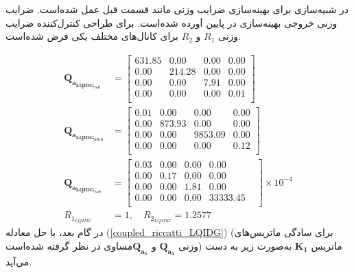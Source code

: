 \documentclass{CCI2020}
\begin{document}
		در شبیه‌سازی برای بهینه‌سازی ضرایب وزنی مانند قسمت قبل عمل شده‌است. ضرایب وزنی خروجی بهینه‌سازی در پایین آورده شده‌است. برای طراحی کنترل‌کننده
		ضرایب وزنی
		$R_1$
		و
		$R_2$
		برای کانال‌های مختلف یکی فرض شده‌است.
		
		\begin{equation}
			\begin{split}
				\boldsymbol{Q_{a_{LQIDG_{roll}}}} &= \begin{bmatrix}
					631.85 & 0.00 & 0.00 & 0.00  \\ 
					0.00 & 214.28 & 0.00 & 0.00  \\ 
					0.00 & 0.00 & 7.91 & 0.00  \\ 
					0.00 & 0.00 & 0.00 & 0.01  \\ 
				\end{bmatrix} \\
				\boldsymbol{Q_{a_{LQIDG_{pitch}}}} &= \begin{bmatrix}
					0.01 & 0.00 & 0.00 & 0.00  \\
					0.00 & 873.93 & 0.00 & 0.00  \\ 
					0.00 & 0.00 & 9853.09 & 0.00 \\ 
					0.00 & 0.00 & 0.00 & 0.12  \\ 
				\end{bmatrix}\\
				\boldsymbol{Q_{a_{LQIDG_{yaw}}}}  &= \begin{bmatrix}
					0.03 & 0.00 & 0.00 & 0.00 & \\ 
					0.00 & 0.17 & 0.00 & 0.00 & \\ 
					0.00 & 0.00 & 1.81 & 0.00 & \\ 
					0.00 & 0.00 & 0.00 & 33333.45 & \\
				\end{bmatrix}\times 10^{-4}\\  R_{1_{LQIDG}} &= 1, \quad  R_{2_{LQIDG}} = 1.2577
			\end{split}
		\end{equation}
		در گام بعد، با حل معادله
		(\ref{coupled_riccatti_LQIDG})
		(برای سادگی ماتریس‌های وزنی $\boldsymbol{{Q}_{a_2}}$ و $\boldsymbol{{Q}_{a_1}}$مساوی در نظر گرفته شده‌است)
		ماتریس
		$\boldsymbol{{K}_1}$
		به‌صورت زیر به دست می‌آید.
\end{document}

